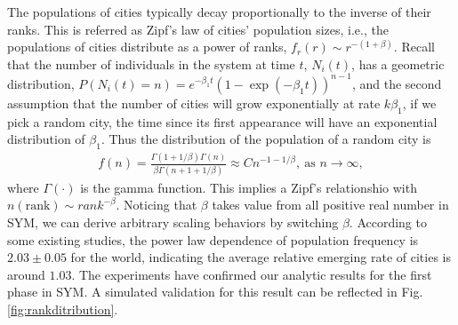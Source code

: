 \documentclass[reprint,unsortedaddress,amsmath,amssymb,aps,prl,showkeys]{revtex4-2}
\begin{document}
The populations of cities typically decay proportionally to the inverse of their ranks\cite{gabaix1999zipf's}. This is referred as Zipf's law of cities' population sizes, i.e., the populations of cities distribute as a power of ranks, $f_r(r)\sim r^{-(1+\beta)}$. Recall that the number of individuals in the system at time $t$, $N_i(t)$, has a geometric distribution\cite{durrett1999essentials}, $P(N_i(t)=n)=e^{-\beta_1t}(1-\exp(- {\beta_1} t))^{n-1}$, and the second assumption that the number of cities will grow exponentially at rate $k\beta_1$, if we pick a random city, the time since its first appearance will have an exponential distribution of $\beta_1$. Thus the distribution of the population of a random city is 
\begin{align}
	f(n)=\frac{\Gamma(1+1/\beta)\Gamma(n)}{\beta\Gamma(n+1+1/\beta)}\approx Cn^{-1-1/\beta}, \ \text{as } n\rightarrow\infty,
\end{align}
where $\Gamma(\cdot)$ is the gamma function. This implies a Zipf's relationshio with $n(\text{rank})\sim {rank}^{-\beta}$. Noticing that $\beta$ takes value from all positive real number in SYM, we can derive arbitrary scaling behaviors by switching $\beta$. According to some existing studies\cite{PhysRevLett.79.523}, the power law dependence of population frequency is $2.03\pm 0.05$ for the world, indicating the average relative emerging rate of cities is around $1.03$. The experiments have confirmed our analytic results for the first phase in SYM. A simulated validation for this result can be reflected in Fig.\@\ref{fig:rankditribution}. 
\end{document}
